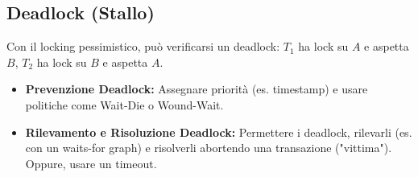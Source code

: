 \subsection{Deadlock (Stallo)}
Con il locking pessimistico, può verificarsi un deadlock: $T_1$ ha lock su $A$ e aspetta $B$, $T_2$ ha lock su $B$ e aspetta $A$.
\begin{itemize}
    \item \textbf{Prevenzione Deadlock:} Assegnare priorità (es. timestamp) e usare politiche come Wait-Die o Wound-Wait.
    \item \textbf{Rilevamento e Risoluzione Deadlock:} Permettere i deadlock, rilevarli (es. con un waits-for graph) e risolverli abortendo una transazione ("vittima"). Oppure, usare un timeout.
\end{itemize}

